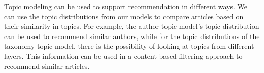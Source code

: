 Topic modeling can be used to support recommendation in different ways.
We can use the topic distributions from our models to compare articles based on their similarity in topics.
For example, the author-topic model's topic distribution can be used to recommend similar authors, while for the topic distributions of the taxonomy-topic model, there is the possibility of looking at topics from different layers.
This information can be used in a content-based filtering approach to recommend similar articles.

